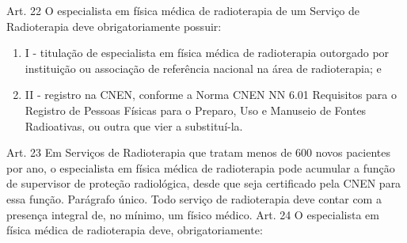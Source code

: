 \noindent Art. 22 O especialista em física médica de radioterapia de um Serviço de Radioterapia deve obrigatoriamente possuir:
\begin{enumerate}[label=\Roman*.]
    \item I - titulação de especialista em física médica de radioterapia outorgado por instituição ou associação de referência nacional na área de radioterapia; e
    \item II - registro na CNEN, conforme a Norma CNEN NN 6.01 Requisitos para o Registro de Pessoas Físicas para o Preparo, Uso e Manuseio de Fontes Radioativas, ou outra que vier a substituí-la.
\end{enumerate}
\noindent Art. 23 Em Serviços de Radioterapia que tratam menos de 600 novos pacientes por ano, o especialista em física médica de radioterapia pode acumular a função de supervisor de proteção radiológica, desde que seja certificado pela CNEN para essa função. Parágrafo único. Todo serviço de radioterapia deve contar com a presença integral de, no mínimo, um físico médico.	
\noindent Art. 24 O especialista em física médica de radioterapia deve, obrigatoriamente:
